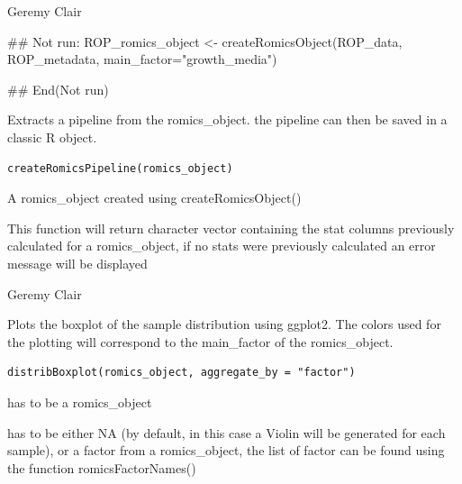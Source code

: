 \documentclass[a4paper]{book}
\begin{document}
%
\begin{Author}
Geremy Clair
\end{Author}
%
\begin{Examples}
\begin{ExampleCode}
## Not run: 
ROP_romics_object <-
createRomicsObject(ROP_data, ROP_metadata, main_factor="growth_media")

## End(Not run)
\end{ExampleCode}
\end{Examples}
%
\begin{Description}
Extracts a pipeline from the romics\_object. the pipeline can then be saved in a classic R object.
\end{Description}
%
\begin{Usage}
\begin{verbatim}
createRomicsPipeline(romics_object)
\end{verbatim}
\end{Usage}
%
\begin{Arguments}
\begin{ldescription}
\item[\code{romics\_object}] A romics\_object created using createRomicsObject()
\end{ldescription}
\end{Arguments}
%
\begin{Value}
This function will return character vector containing the stat columns previously calculated for a romics\_object, if no stats were previously calculated an error message will be displayed
\end{Value}
%
\begin{Author}
Geremy Clair
\end{Author}
%
\begin{Description}
Plots the boxplot of the sample distribution using ggplot2. The colors used for the plotting will correspond to the main\_factor of the romics\_object.
\end{Description}
%
\begin{Usage}
\begin{verbatim}
distribBoxplot(romics_object, aggregate_by = "factor")
\end{verbatim}
\end{Usage}
%
\begin{Arguments}
\begin{ldescription}
\item[\code{romics\_object}] has to be a romics\_object

\item[\code{aggregate\_by}] has to be either NA (by default, in this case a Violin will be generated for each sample), or a factor from a romics\_object, the list of factor can be found using the function romicsFactorNames()
\end{ldescription}
\end{Arguments}
\end{document}

